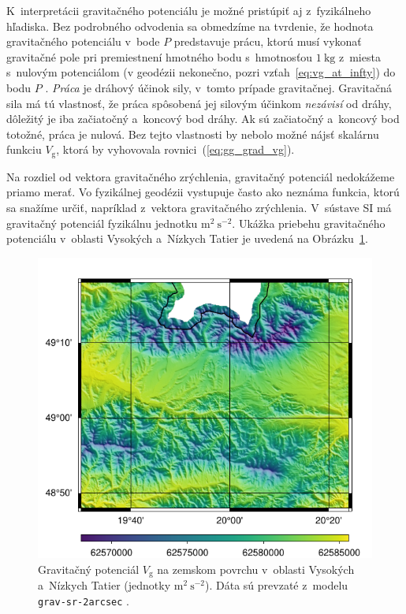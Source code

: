 \documentclass[a4paper,12pt]{book}
\newcommand{\gidx}{\mathrm g}
\begin{document}
K~interpretácii gravitačného potenciálu je možné pristúpiť aj z~fyzikálneho 
hľadiska.  Bez podrobného odvodenia sa obmedzíme na tvrdenie, že hodnota 
gravitačného potenciálu v~bode $P$ predstavuje prácu, ktorú musí vykonať 
gravitačné pole pri premiestnení hmotného bodu s~hmotnosťou $1\ \mathrm{kg}$ 
z~miesta s~nulovým potenciálom (v geodézii nekonečno, pozri 
vzťah~\ref{eq:vg_at_infty}) do bodu $P$ 
\parencite{MacMillan1930,Kellogg1967,TorgeGeodesy}.  \emph{Práca} je dráhový 
účinok sily, v~tomto prípade gravitačnej.  Gravitačná sila má tú vlastnosť, že 
práca spôsobená jej silovým účinkom \emph{nezávisí} od dráhy, dôležitý je iba 
začiatočný a~koncový bod dráhy.  Ak sú začiatočný a~koncový bod totožné, práca 
je nulová.  Bez tejto vlastnosti by nebolo možné nájsť skalárnu funkciu 
$V_\gidx$, ktorá by vyhovovala rovnici~(\ref{eq:gg_grad_vg}).

Na rozdiel od vektora gravitačného zrýchlenia, gravitačný potenciál nedokážeme
priamo merať.  Vo fyzikálnej geodézii vystupuje často ako neznáma funkcia,
ktorú sa snažíme určiť, napríklad z~vektora gravitačného zrýchlenia.  V~sústave
SI má gravitačný potenciál fyzikálnu jednotku $\mathrm{m}^2\ \mathrm{s}^{-2}$.
Ukážka priebehu gravitačného potenciálu v~oblasti Vysokých a~Nízkych Tatier je
uvedená na Obrázku~\ref{fig:vg_grav_sr_2arcsec}.

\begin{figure}
\centering
\includegraphics{./fig-vg-grav-sr-2arcsec.pdf}
\caption{Gravitačný potenciál $V_\gidx$ na zemskom povrchu v~oblasti Vysokých
a~Nízkych Tatier (jednotky $\mathrm{m}^2 \ \mathrm{s}^{-2}$).  Dáta sú prevzaté
z~modelu \texttt{grav-sr-2arcsec} \parencite{GravSR2arcsec}.}
\label{fig:vg_grav_sr_2arcsec}
\end{figure}
\end{document}
